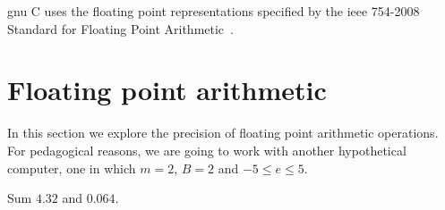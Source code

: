 \acrshort{gnu} C uses the floating point representations specified by the
\acrshort{ieee} 754-2008 Standard for Floating Point Arithmetic~\cite{4610935}.

\section{Floating point arithmetic}\label{sec:floating-point-arithmetic}

In this section we explore the precision of floating point arithmetic
operations. For pedagogical reasons, we are going to work with another
hypothetical computer, one in which \(m=2\), \(B=2\) and
\(-5\leqslant{e}\leqslant{5}\).

\begin{example}
  Sum \(4.32\) and \(0.064\).
\end{example}

